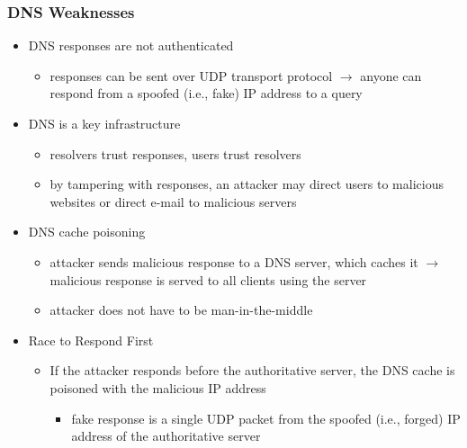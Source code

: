 \documentclass[final]{article}
\begin{document}
\subsubsection*{DNS Weaknesses}
\begin{itemize}[nosep]
    \item DNS responses are not authenticated
          \begin{itemize}[nosep]
              \item responses can be sent over UDP transport protocol $\rightarrow$ anyone can respond from a spoofed (i.e., fake) IP address to a query
          \end{itemize}
    \item DNS is a key infrastructure
          \begin{itemize}[nosep]
              \item resolvers trust responses, users trust resolvers
              \item by tampering with responses, an attacker may direct users to malicious websites or direct e-mail to malicious servers
          \end{itemize}
    \item DNS cache poisoning
          \begin{itemize}[nosep]
              \item attacker sends malicious response to a DNS server, which caches it $\rightarrow$ malicious response is served to all clients using the server
              \item attacker does not have to be man-in-the-middle
          \end{itemize}
    \item Race to Respond First
          \begin{itemize}[nosep]
              \item If the attacker responds before the authoritative server, the DNS cache is poisoned with the malicious IP address
                    \begin{itemize}[nosep]
                        \item fake response is a single UDP packet from the spoofed (i.e., forged) IP address of the authoritative server
                    \end{itemize}
          \end{itemize}
\end{itemize}
\end{document}
